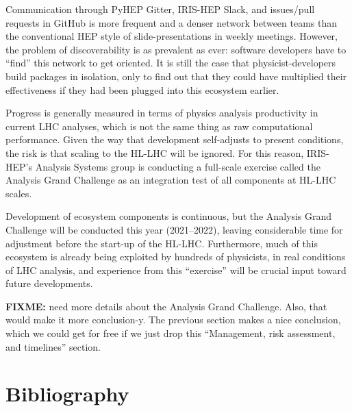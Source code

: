 \documentclass{article}
\begin{document}
Communication through PyHEP Gitter, IRIS-HEP Slack, and issues/pull requests in GitHub is more frequent and a denser network between teams than the conventional HEP style of slide-presentations in weekly meetings. However, the problem of discoverability is as prevalent as ever: software developers have to ``find'' this network to get oriented. It is still the case that physicist-developers build packages in isolation, only to find out that they could have multiplied their effectiveness if they had been plugged into this ecosystem earlier.

Progress is generally measured in terms of physics analysis productivity in current LHC analyses, which is not the same thing as raw computational performance. Given the way that development self-adjusts to present conditions, the risk is that scaling to the HL-LHC will be ignored. For this reason, IRIS-HEP's Analysis Systems group is conducting a full-scale exercise called the Analysis Grand Challenge as an integration test of all components at HL-LHC scales.

Development of ecosystem components is continuous, but the Analysis Grand Challenge will be conducted this year (2021--2022), leaving considerable time for adjustment before the start-up of the HL-LHC. Furthermore, much of this ecosystem is already being exploited by hundreds of physicists, in real conditions of LHC analysis, and experience from this ``exercise'' will be crucial input toward future developments.

{\bf FIXME:} need more details about the Analysis Grand Challenge. Also, that would make it more conclusion-y. The previous section makes a nice conclusion, which we could get for free if we just drop this ``Management, risk assessment, and timelines'' section.

\section{Bibliography}

{}

\end{document}

